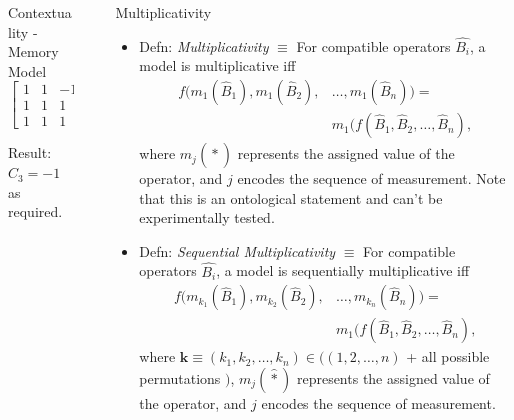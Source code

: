 \documentclass[final,hyperref={pdfpagelabels=false}]{beamer}
\begin{document}
\begin{frame}[t]
\begin{columns}[c]
\begin{column}{.32\textwidth}
\begin{block}{Contextuality - Memory Model}
    \begin{equation}\label{eq:oneMinus}
      \left[
    \begin{array}{ccc}
      1 & 1 & -1 \\
      1 & 1 & 1 \\
      1 & 1 & 1
    \end{array} 
    \right]
    \end{equation}

    Result: $C_3=-1$ as required.

  \end{block}


\end{column}
\begin{column}{.01\textwidth}\end{column} %
\begin{column}{.32\textwidth} %


  \begin{block}{Multiplicativity}
    \begin{itemize}
      \item Defn: \emph{Multiplicativity} $\equiv$ For compatible operators $\hat{B_i}$, a model is multiplicative iff 
        \begin{align} f(m_1(\hat{B}_1),m_1(\hat{B}_2),&\dots,m_1(\hat{B}_n)) = \\
          &m_1(f(\hat{B}_1,\hat{B}_2,\dots,\hat{B}_n),
        \end{align}
        where $m_j(\hat *)$ represents the assigned value of the operator, and $j$ encodes the sequence of measurement. Note that this is an ontological statement and can't be experimentally tested.

      \item Defn: \emph{Sequential Multiplicativity} $\equiv$ For compatible operators $\hat{B_i}$, a model is sequentially multiplicative iff 
        \begin{align} f(m_{k_1}(\hat{B}_1),m_{k_2}(\hat{B}_2),&\dots,m_{k_n}(\hat{B}_n)) = \\
          &m_1(f(\hat{B}_1,\hat{B}_2,\dots,\hat{B}_n),
        \end{align}
        where $\mathbf k \equiv (k_1,k_2,\dots,k_n) \in ((1,2,\dots,n)$ + all possible permutations $)$, $m_j(\hat *)$ represents the assigned value of the operator, and $j$ encodes the sequence of measurement.


\end{itemize}
\end{block}
\end{column}
\end{columns}
\end{frame}
\end{document}
